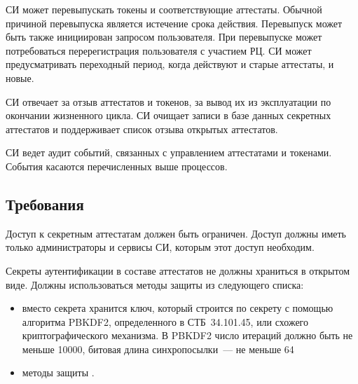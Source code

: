 \fi

СИ может перевыпускать токены и соответствующие аттестаты. Обычной причиной
перевыпуска является истечение срока действия. Перевыпуск может быть также
инициирован запросом пользователя. При перевыпуске может потребоваться
перерегистрация пользователя с участием РЦ. СИ может предусматривать переходный
период, когда действуют и старые аттестаты, и новые.

СИ отвечает за отзыв аттестатов и токенов, за вывод их из эксплуатации по 
окончании жизненного цикла. 
%
СИ очищает записи в базе данных секретных аттестатов и поддерживает список 
отзыва открытых аттестатов.

СИ ведет аудит событий, связанных с управлением аттестатами и токенами. 
События касаются перечисленных выше процессов.

\subsection{Требования}\label{CM.Reqs}

Доступ к секретным аттестатам должен быть ограничен.
Доступ должны иметь только администраторы и сервисы СИ,
которым этот доступ необходим. 

Секреты аутентификации в составе аттестатов не должны храниться в открытом 
виде. Должны использоваться методы защиты из следующего списка: 
\begin{itemize}
\item
вместо секрета хранится ключ, который строится по секрету с помощью 
алгоритма PBKDF2, определенного в СТБ~34.101.45, или схожего криптографического 
механизма.
%
В PBKDF2 число итераций должно быть не меньше 10000,
битовая длина синхропосылки~--- не меньше 64\addendum{;}

\item
методы защиты .
\end{itemize}

